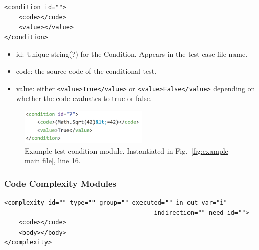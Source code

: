 \documentclass[12pt]{article}
\begin{document}
\begin{verbatim}
<condition id="">
    <code></code>
    <value></value>
</condition>
\end{verbatim}

\begin{itemize}
    \item id: Unique string(?) for the Condition.  Appears in
    the test case file name.
    
    \item code: the source code of the conditional test.

    \item value: either \verb|<value>True</value>| or
        \verb|<value>False</value>| depending on \\
        whether the code evaluates to true or false.
\end{itemize}

\begin{figure}[htbp]
  \includegraphics[width=2.4in]{fig_Complexity_file_test.png}
  \caption{Example test condition module.  Instantiated in
    Fig.~\ref{fig:example main file}, line 16.}
  \label{fig:example complexity-test file}
\end{figure}


\subsubsection{Code Complexity Modules}
\label{sec: complexity modules}

\begin{verbatim}
<complexity id="" type="" group="" executed="" in_out_var="i" 
                                         indirection="" need_id="">
    <code></code>
	<body></body>
</complexity>
\end{verbatim}
\end{document}
